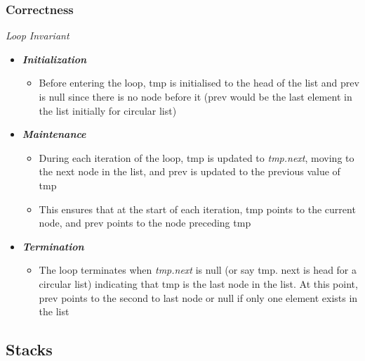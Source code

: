 \documentclass[10pt, 
a4paper, 
oneside, 
headinclude, footinclude, 
BCOR5mm]
{scrartcl}
\begin{document}
\subsubsection{Correctness}
\textit{Loop Invariant}
\begin{itemize}
    \item \textit{\textbf{Initialization}}
    \begin{itemize}
        \item Before entering the loop, tmp is initialised to the head of the list and prev is null since there is no node
        before it (prev would be the last element in the list initially for circular list)
    \end{itemize}
    \item \textit{\textbf{Maintenance}}
    \begin{itemize}
        \item During each iteration of the loop, tmp is updated to \textit{tmp.next}, moving to the next node in the list, and
        prev is updated to the previous value of tmp
        \item This ensures that at the start of each iteration, tmp points to the current node, and prev points to the
        node preceding tmp
    \end{itemize}
    \item \textit{\textbf{Termination}}
    \begin{itemize}
        \item The loop terminates when \textit{tmp.next} is null (or say tmp. next is head for a circular list) indicating that tmp
        is the last node in the list. At this point, prev points to the second to last node or null if only one element
        exists in the list
    \end{itemize}
\end{itemize}
\newpage
\subsection{Stacks}
\end{document}
